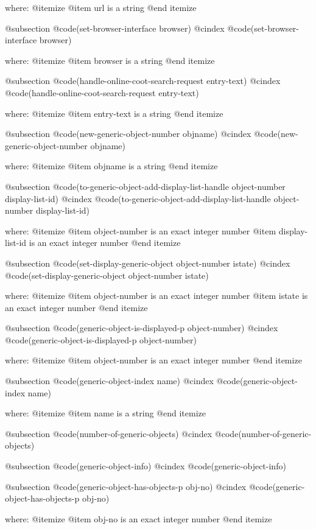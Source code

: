 where: 
 @itemize 
     @item url is a string
 @end itemize


@subsection @code{(set-browser-interface browser)}
@cindex @code{(set-browser-interface browser)}
 
where: 
 @itemize 
     @item browser is a string
 @end itemize


@subsection @code{(handle-online-coot-search-request entry-text)}
@cindex @code{(handle-online-coot-search-request entry-text)}
 
where: 
 @itemize 
     @item entry-text is a string
 @end itemize


@subsection @code{(new-generic-object-number objname)}
@cindex @code{(new-generic-object-number objname)}
 
where: 
 @itemize 
     @item objname is a string
 @end itemize


@subsection @code{(to-generic-object-add-display-list-handle object-number display-list-id)}
@cindex @code{(to-generic-object-add-display-list-handle object-number display-list-id)}
 
where: 
 @itemize 
     @item object-number is an exact integer number
     @item display-list-id is an exact integer number
 @end itemize


@subsection @code{(set-display-generic-object object-number istate)}
@cindex @code{(set-display-generic-object object-number istate)}
 
where: 
 @itemize 
     @item object-number is an exact integer number
     @item istate is an exact integer number
 @end itemize


@subsection @code{(generic-object-is-displayed-p object-number)}
@cindex @code{(generic-object-is-displayed-p object-number)}
 
where: 
 @itemize 
     @item object-number is an exact integer number
 @end itemize


@subsection @code{(generic-object-index name)}
@cindex @code{(generic-object-index name)}
 
where: 
 @itemize 
     @item name is a string
 @end itemize


@subsection @code{(number-of-generic-objects)}
@cindex @code{(number-of-generic-objects)}
 
@subsection @code{(generic-object-info)}
@cindex @code{(generic-object-info)}
 
@subsection @code{(generic-object-has-objects-p obj-no)}
@cindex @code{(generic-object-has-objects-p obj-no)}
 
where: 
 @itemize 
     @item obj-no is an exact integer number
 @end itemize


